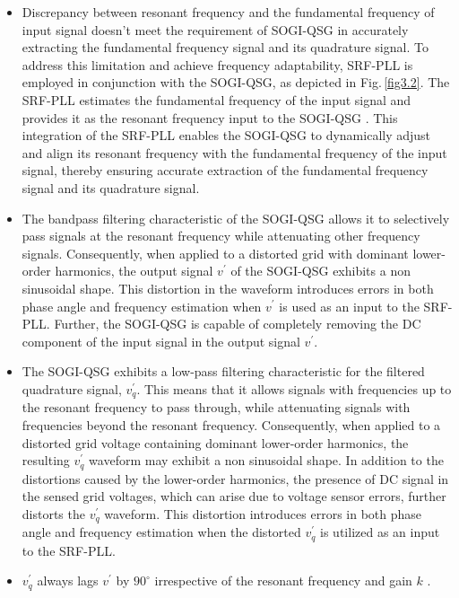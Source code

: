 \begin{itemize}
	\item Discrepancy between resonant frequency and the fundamental frequency of input signal doesn't meet the requirement of SOGI-QSG in accurately extracting the fundamental frequency signal and its quadrature signal. To address this limitation and achieve frequency adaptability, SRF-PLL is employed in conjunction with the SOGI-QSG, as depicted in Fig.\,\ref{fig3.2}. The SRF-PLL estimates the fundamental frequency of the input signal and provides it as the resonant frequency input to the SOGI-QSG \cite{1712059}. This integration of the SRF-PLL enables the SOGI-QSG to dynamically adjust and align its resonant frequency with the fundamental frequency of the input signal, thereby ensuring accurate extraction of the fundamental frequency signal and its quadrature signal.
	\item The bandpass filtering characteristic of the SOGI-QSG allows it to selectively pass signals at the resonant frequency while attenuating other frequency signals. Consequently, when applied to a distorted grid with dominant lower-order harmonics, the output signal $v^{\prime}$ of the SOGI-QSG exhibits a non sinusoidal shape. This distortion in the waveform introduces errors in both phase angle and frequency estimation when $v^{\prime}$ is used as an input to the SRF-PLL. Further, the SOGI-QSG is capable of completely removing the DC component of the input signal in the output signal $v^{\prime}$.
	\item The SOGI-QSG exhibits a low-pass filtering characteristic for the filtered quadrature signal, $v^{\prime}_{q}$. This means that it allows signals with frequencies up to the resonant frequency to pass through, while attenuating signals with frequencies beyond the resonant frequency. Consequently, when applied to a distorted grid voltage containing dominant lower-order harmonics, the resulting $v^{\prime}_{q}$ waveform may exhibit a non sinusoidal shape. In addition to the distortions caused by the lower-order harmonics, the presence of DC signal in the sensed grid voltages, which can arise due to voltage sensor errors, further distorts the $v^{\prime}_{q}$ waveform. This distortion introduces errors in both phase angle and frequency estimation when the distorted $v^{\prime}_{q}$ is utilized as an input to the SRF-PLL.
	\item $v^{\prime}_{q}$ always lags $v^{\prime}$ by $90^{\circ}$ irrespective of the resonant frequency and gain $k$ \cite{4153695}. 
\end{itemize}
